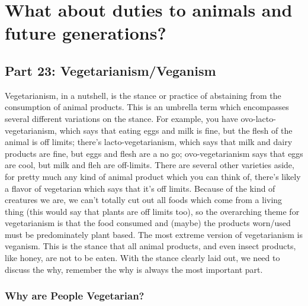 \part{What about duties to animals and future generations?}
\label{ch.modten}
\chapter{Part 23: Vegetarianism/Veganism}

Vegetarianism, in a nutshell, is the stance or practice of abstaining from the consumption of animal products. This is an umbrella term which encompasses several different variations on the stance. For example, you have ovo-lacto-vegetarianism, which says that eating eggs and milk is fine, but the flesh of the animal is off limits; there's lacto-vegetarianism, which says that milk and dairy products are fine, but eggs and flesh are a no go; ovo-vegetarianism says that eggs are cool, but milk and fleh are off-limits. There are several other varieties aside, for pretty much any kind of animal product which you can think of, there's likely a flavor of vegetarian which says that it's off limits. Because of the kind of creatures we are, we can't totally cut out all foods which come from a living thing (this would say that plants are off limits too), so the overarching theme for vegetarianism is that the food consumed and (maybe) the products worn/used must be predominately plant based.  The most extreme version of vegetarianism is veganism. This is the stance that all animal products, and even insect products, like honey, are not to be eaten. With the stance clearly laid out, we need to discuss the why, remember the why is always the most important part.
\section{Why are People Vegetarian?}  

